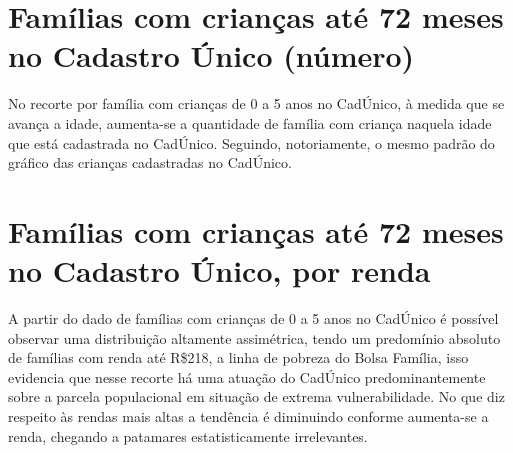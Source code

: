 
\section{Famílias com crianças até 72 meses no Cadastro Único (número)}


No recorte por família com crianças de 0 a 5 anos no CadÚnico, à medida que se avança a idade, aumenta-se a quantidade de família com criança naquela idade que está cadastrada no CadÚnico. Seguindo, notoriamente, o mesmo padrão do gráfico das crianças cadastradas no CadÚnico.


\section{Famílias com crianças até 72 meses no Cadastro Único, por renda}


A partir do dado de famílias com crianças de 0 a 5 anos no CadÚnico é possível observar uma distribuição altamente assimétrica, tendo um predomínio absoluto de famílias com renda até R\$218, a linha de pobreza do Bolsa Família, isso evidencia que nesse recorte há uma atuação do CadÚnico predominantemente sobre a parcela populacional em situação de extrema vulnerabilidade. No que diz respeito às rendas mais altas a tendência é diminuindo conforme aumenta-se a renda, chegando a patamares estatisticamente irrelevantes.


